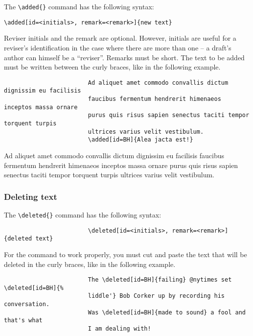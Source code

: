 \documentclass[english]{article}
\newcommand{\cmd}[1]{%
	\texttt{\textbackslash#1\{\}}
}
\begin{document}
				The \cmd{added} command has the following syntax:
				
				\begin{shaded*}
					\verb|\added[id=<initials>, remark=<remark>]{new text}|
				\end{shaded*}
			
				Reviser initials and the remark are optional. However, initials are useful for a reviser's
				identification in the case where there are more than one -- a draft's author can himself
				be a ``reviser''. Remarks must be short. The text to be added must be written between the
				curly braces, like in the following example.
				
				\begin{shaded*}
					\begin{verbatim}
						Ad aliquet amet commodo convallis dictum dignissim eu facilisis 
						faucibus fermentum hendrerit himenaeos inceptos massa ornare 
						purus quis risus sapien senectus taciti tempor torquent turpis 
						ultrices varius velit vestibulum.
						\added[id=BH]{Alea jacta est!}
					\end{verbatim}
				\end{shaded*}
			
				\begin{leftbar}
					Ad aliquet amet commodo convallis dictum dignissim eu facilisis 
					faucibus fermentum hendrerit himenaeos inceptos massa ornare 
					purus quis risus sapien senectus taciti tempor torquent turpis 
					ultrices varius velit vestibulum.
				\end{leftbar}
			
			\subsubsection{Deleting text}
			
				The \cmd{deleted} command has the following syntax:
				
				\begin{shaded*}
					\begin{verbatim}
						\deleted[id=<initials>, remark=<remark>]{deleted text}
					\end{verbatim}
				\end{shaded*}
			
				For the command to work properly, you must cut and paste the text that will be deleted
				in the curly braces, like in the following example.
				
				\begin{shaded*}
					\begin{verbatim}
						The \deleted[id=BH]{failing} @nytimes set \deleted[id=BH]{%
						liddle'} Bob Corker up by recording his conversation. 
						Was \deleted[id=BH]{made to sound} a fool and that's what 
						I am dealing with!
					\end{verbatim}
				\end{shaded*}
			
\end{document}
